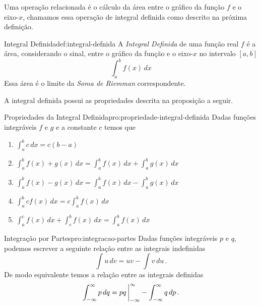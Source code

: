 Uma operação relacionada é o cálculo da área entre o gráfico da função $f$ e
o eixo-$x$, chamamos essa operação de integral definida como descrito na
próxima definição.

\begin{definicao}{Integral Definida}{def:integral-defnida}
  A \emph{Integral Definida} de uma função real $f$
  é a área, considerando o sinal, entre o gráfico da função e o eixo-$x$
  no intervalo $[a, b]$
  \[
    \int_{a}^{b} f(x) \, dx
  \]
  Essa área é o limite da \emph{Soma de Riemman} correspondente.
\end{definicao}

A integral definida possui as propriedades descrita na proposição a seguir.

\begin{proposicao}{Propriedades da Integral Definida}{pro:propriedade-integral-definida}
  Dadas funções integráveis $f$ e $g$ e a constante $c$ temos que
  \begin{enumerate}
    \item \( \int_a^b c\,dx = c(b-a) \)
    \item \( \int_a^b f(x)+g(x)\,dx = \int_a^b f(x)\,dx + \int_a^b g(x)\,dx\)
    \item \( \int_a^b f(x)-g(x)\,dx = \int_a^b f(x)\,dx - \int_a^b g(x)\,dx\)
    \item \( \int_a^b cf(x)\,dx = c \int_a^b f(x)\,dx \)
    \item \( \int_a^c f(x)\,dx + \int_c^b f(x)\,dx = \int_a^b f(x)\,dx \)
  \end{enumerate}
\end{proposicao}

\begin{proposicao}{Integração por Partes}{pro:integracao-partes}
  Dadas funções integráveis $p$ e $q$, podemos escrever a seguinte relação
  entre as integrais indefinidas
  \[
    \int u\,dv = uv - \int v\,du \,.
  \]
  De modo equivalente temos a relação entre as integrais definidas
  \[
    \int_{-\infty}^\infty p\,dq = pq \, \bigg\rvert_{-\infty}^{\infty} - \int_{-\infty}^\infty q\,dp \,.
  \]
\end{proposicao}

